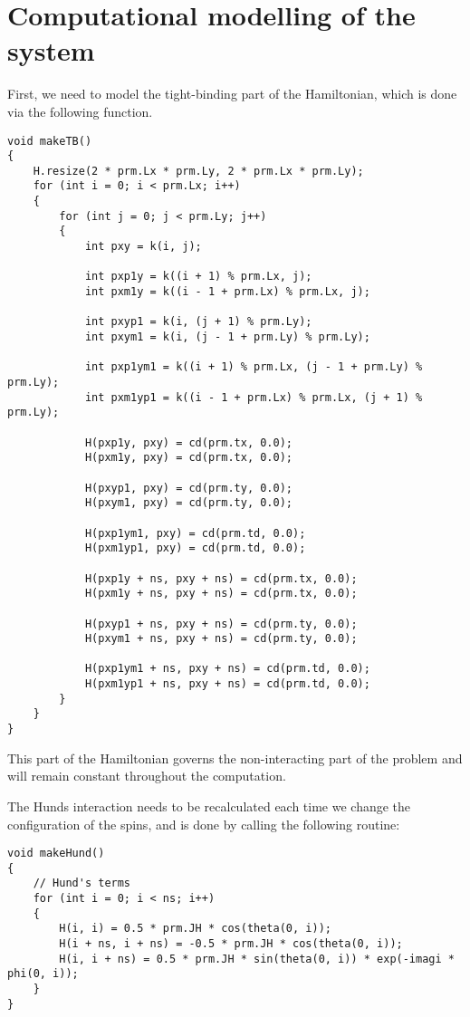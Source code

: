 \documentclass[]{article}
\begin{document}
\section{Computational modelling of the system}
First, we need to model the tight-binding part of the Hamiltonian, which is done via the following function.

\begin{lstlisting}
void makeTB()
{
	H.resize(2 * prm.Lx * prm.Ly, 2 * prm.Lx * prm.Ly);
	for (int i = 0; i < prm.Lx; i++)
	{
		for (int j = 0; j < prm.Ly; j++)
		{
			int pxy = k(i, j);
			
			int pxp1y = k((i + 1) % prm.Lx, j);
			int pxm1y = k((i - 1 + prm.Lx) % prm.Lx, j);
			
			int pxyp1 = k(i, (j + 1) % prm.Ly);
			int pxym1 = k(i, (j - 1 + prm.Ly) % prm.Ly);
			
			int pxp1ym1 = k((i + 1) % prm.Lx, (j - 1 + prm.Ly) % prm.Ly);
			int pxm1yp1 = k((i - 1 + prm.Lx) % prm.Lx, (j + 1) % prm.Ly);
			
			H(pxp1y, pxy) = cd(prm.tx, 0.0);
			H(pxm1y, pxy) = cd(prm.tx, 0.0);
			
			H(pxyp1, pxy) = cd(prm.ty, 0.0);
			H(pxym1, pxy) = cd(prm.ty, 0.0);
			
			H(pxp1ym1, pxy) = cd(prm.td, 0.0);
			H(pxm1yp1, pxy) = cd(prm.td, 0.0);
			
			H(pxp1y + ns, pxy + ns) = cd(prm.tx, 0.0);
			H(pxm1y + ns, pxy + ns) = cd(prm.tx, 0.0);
			
			H(pxyp1 + ns, pxy + ns) = cd(prm.ty, 0.0);
			H(pxym1 + ns, pxy + ns) = cd(prm.ty, 0.0);
			
			H(pxp1ym1 + ns, pxy + ns) = cd(prm.td, 0.0);
			H(pxm1yp1 + ns, pxy + ns) = cd(prm.td, 0.0);
		}
	}
}
\end{lstlisting}
This part of the Hamiltonian governs the non-interacting part of the problem and will remain constant throughout the computation.

The Hunds interaction needs to be recalculated each time we change the configuration of the spins, and is done by calling the following routine:

\begin{lstlisting}
void makeHund()
{
	// Hund's terms
	for (int i = 0; i < ns; i++)
	{
		H(i, i) = 0.5 * prm.JH * cos(theta(0, i));
		H(i + ns, i + ns) = -0.5 * prm.JH * cos(theta(0, i));
		H(i, i + ns) = 0.5 * prm.JH * sin(theta(0, i)) * exp(-imagi * phi(0, i));
	}
}
\end{lstlisting}
\end{document}
